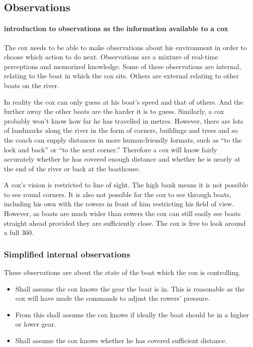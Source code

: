       \subsection{Observations} \label{model:cox:obs}
      \paragraph{introduction to observations as the information available to a cox}
      The cox needs to be able to make observations about his environment in order to choose which action to do next. Observations are a mixture of real-time perceptions and memorized knowledge. Some of these observations are internal, relating to the boat in which the cox sits. Others are external relating to other boats on the river. 
      
      In reality the cox can only guess at his boat's speed and that of others. And the further away the other boats are the harder it is to guess. Similarly, a cox probably won't know how far he has travelled in metres. However, there are lots of landmarks along the river in the form of corners, buildings and trees and so the coach can supply distances in more human-friendly formats, such as ``to the lock and back'' or ``to the next corner.'' Therefore a cox will know fairly accurately whether he has covered enough distance and whether he is nearly at the end of the river or back at the boathouse.
      
      A cox's vision is restricted to line of sight. The high bank means it is not possible to see round corners. It is also not possible for the cox to see through boats, including his own with the rowers in front of him restricting his field of view. However, as boats are much wider than rowers the cox can still easily see boats straight ahead provided they are sufficiently close. The cox is free to look around a full 360\textdegree.
      
      \subsubsection{Simplified internal observations}
      These observations are about the state of the boat which the cox is controlling.
      \begin{itemize}
        \item Shall assume the cox knows the gear the boat is in. This is reasonable as the cox will have made the commands to adjust the rowers' pressure.
        \item From this shall assume the cox knows if ideally the boat should be in a higher or lower gear.
        \item Shall assume the cox knows whether he has covered sufficient distance.
      \end{itemize}

